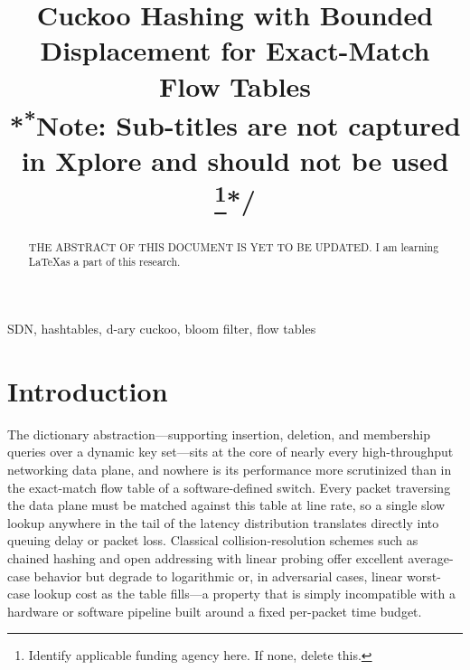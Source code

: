 \documentclass[conference]{IEEEtran}
\begin{document}
\long{}

\title{Cuckoo Hashing with Bounded Displacement for Exact-Match Flow Tables\\
\/*{\footnotesize \textsuperscript{*}Note: Sub-titles are not captured in Xplore and
should not be used}
\thanks{Identify applicable funding agency here. If none, delete this.}*/
}

\author{
}

\maketitle

\begin{abstract}
THE ABSTRACT OF THIS DOCUMENT IS YET TO BE UPDATED. I am learning \LaTeX as a part of this research.
\end{abstract}

\begin{IEEEkeywords}
SDN, hashtables, d-ary cuckoo, bloom filter, flow tables
\end{IEEEkeywords}

\section{Introduction}
The dictionary abstraction---supporting insertion, deletion, and membership queries over a dynamic key set---sits at the core of nearly every high-throughput networking data plane, and nowhere is its performance more scrutinized than in the exact-match flow table of a software-defined switch. Every packet traversing the data plane must be matched against this table at line rate, so a single slow lookup anywhere in the tail of the latency distribution translates directly into queuing delay or packet loss. Classical collision-resolution schemes such as chained hashing and open addressing with linear probing offer excellent average-case behavior but degrade to logarithmic or, in adversarial cases, linear worst-case lookup cost as the table fills---a property that is simply incompatible with a hardware or software pipeline built around a fixed per-packet time budget.
\end{document}
